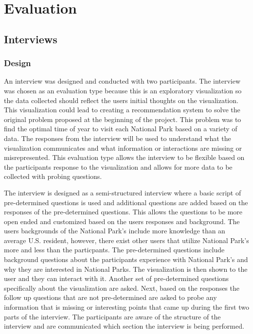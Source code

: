 \section{Evaluation}

\subsection{Interviews}

\subsubsection{Design}
An interview was designed and conducted with two participants. The interview was chosen as an evaluation type because this is an exploratory visualization so the data collected should reflect the users initial thoughts on the visualization. This visualization could lead to creating a recommendation system to solve the original problem proposed at the beginning of the project. This problem was to find the optimal time of year to visit each National Park based on a variety of data. The responses from the interview will be used to understand what the visualization communicates and what information or interactions are missing or misrepresented. This evaluation type allows the interview to be flexible based on the participants response to the visualization and allows for more data to be collected with probing questions. 

The interview is designed as a semi-structured interview where a basic script of pre-determined questions is used and additional questions are added based on the responses of the pre-determined questions. This allows the questions to be more open ended and customized based on the users responses and background. The users backgrounds of the National Park's include more knowledge than an average U.S. resident, however, there exist other users that utilize National Park's more and less than the particpants. The pre-determined questions include background questions about the participants experience with National Park's and why they are interested in National Parks. The visualization is then shown to the user and they can interact with it. Another set of pre-determined questions specifically about the visualization are asked. Next, based on the responses the follow up questions that are not pre-determined are asked to probe any information that is missing or interesting points that came up during the first two parts of the interview. The participants are aware of the structure of the interview and are communicated which section the interview is being performed. 

